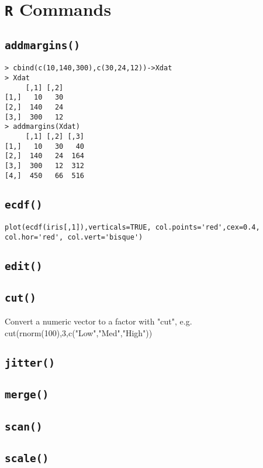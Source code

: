 
\section{\texttt{R} Commands}
\subsection{\texttt{addmargins()}}
\begin{framed}
\begin{verbatim}
> cbind(c(10,140,300),c(30,24,12))->Xdat
> Xdat
     [,1] [,2]
[1,]   10   30
[2,]  140   24
[3,]  300   12
> addmargins(Xdat)
     [,1] [,2] [,3]
[1,]   10   30   40
[2,]  140   24  164
[3,]  300   12  312
[4,]  450   66  516
\end{verbatim}
\end{framed}
\subsection{\texttt{ecdf()}}
\begin{framed}
\begin{verbatim}
plot(ecdf(iris[,1]),verticals=TRUE, col.points='red',cex=0.4, col.hor='red', col.vert='bisque')
\end{verbatim}
\end{framed}
\subsection{\texttt{edit()}}
\subsection{\texttt{cut()}}
Convert a numeric vector to a factor with "cut", e.g. 
cut(rnorm(100),3,c("Low","Med","High")) 

\subsection{\texttt{jitter()}}
\subsection{\texttt{merge()}}
\subsection{\texttt{scan()}}
\subsection{\texttt{scale()}}
